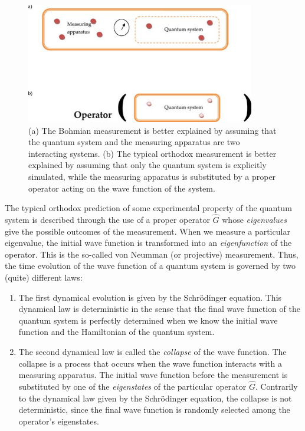\documentclass[nofootinbib, secnumarabic, amsmath, nobibnotes,11pt,aps,pra, floatfix]{revtex4-1}
\begin{document}
\begin{figure}
\centering
\includegraphics[width=10cm]{F1_09.pdf}
\caption{(a) The Bohmian measurement is better explained by assuming that the quantum system and the measuring apparatus are two interacting systems. (b) The typical orthodox measurement is better explained by assuming that only the quantum system is explicitly simulated, while the measuring apparatus is substituted by a proper operator acting on the wave function of the system.}
\label{om_measure2}
\end{figure}

The typical orthodox prediction of some experimental property of the quantum system is described through the use of a proper operator $\hat{G}$ whose \textit{eigenvalues} give the possible outcomes of the measurement. When we measure a particular eigenvalue, the initial wave function is transformed into an \textit{eigenfunction} of the operator. This is the so-called von Neumman (or projective) measurement.
Thus, the time evolution of the wave function of a quantum system is governed by two (quite) different laws:
\begin{enumerate}
\item The first dynamical evolution is given by the Schr\"odinger equation. This dynamical law is deterministic in the sense that the final wave function of the quantum system is perfectly determined when we know the initial wave function and the Hamiltonian of the quantum system.

\item The second dynamical law is called the \textit{collapse} of the wave function. The collapse is a process that occurs when the wave function interacts with a measuring apparatus. The initial wave function before the measurement is substituted by one of the \textit{eigenstates} of the particular operator $\hat{G}$\!. Contrarily to the dynamical law given by the Schr\"odinger equation, the collapse is not deterministic, since the final wave function is randomly selected among the operator's eigenstates.
\end{enumerate}
\end{document}
